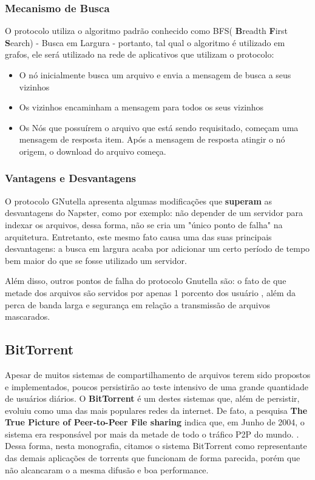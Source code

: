 \documentclass[a4paper]{article}
\begin{document}
\subsubsection{Mecanismo de Busca}
O protocolo utiliza o algoritmo padrão conhecido como BFS( \textbf{B}readth \textbf{F}irst \textbf{S}earch) - Busca em Largura - portanto, tal qual o algoritmo é utilizado em grafos, ele será utilizado na rede de aplicativos que utilizam o protocolo:\cite{gayatriGN}
\begin{itemize}
	\item O nó inicialmente busca um arquivo e envia a mensagem de busca a seus vizinhos
	\item Os vizinhos encaminham a mensagem para todos os seus vizinhos
	\item Os Nós que possuírem o arquivo que está sendo requisitado, começam uma mensagem de resposta
	item. Após a mensagem de resposta atingir o nó origem, o download do arquivo começa.
\end{itemize}
\subsubsection{Vantagens e Desvantagens}
O protocolo GNutella apresenta algumas modificações que \textbf{superam} as desvantagens do Napster, como por exemplo: não depender de um servidor para indexar os arquivos, dessa forma, não se cria um "único ponto de falha" na arquitetura. Entretanto, este mesmo fato causa uma das suas principais desvantagens: a busca em largura acaba por adicionar um certo período de tempo bem maior do que se fosse utilizado um servidor.

Além disso, outros pontos de falha do protocolo Gnutella são: o fato de que metade dos arquivos são servidos por apenas 1 porcento dos usuário , além da perca de banda larga e segurança em relação a transmissão de arquivos mascarados.\cite{gayatriGN}

\subsection{BitTorrent}
Apesar de muitos sistemas de compartilhamento de arquivos terem sido propostos e implementados, poucos persistirão ao teste intensivo de uma grande quantidade de usuários diários. O \textbf{BitTorrent} é um destes sistemas que, além de persistir, evoluiu como uma das mais populares redes da internet. De fato, a pesquisa \textbf{The True Picture of Peer-to-Peer File sharing} indica que, em Junho de 2004, o sistema era responsável por mais da metade de todo o tráfico P2P do mundo. \cite{pouwelsebit}. Dessa forma, nesta monografia, citamos o sistema BitTorrent como representante das demais aplicações de torrents que funcionam de forma parecida, porém que não alcancaram o a mesma difusão e boa performance.
\end{document}
